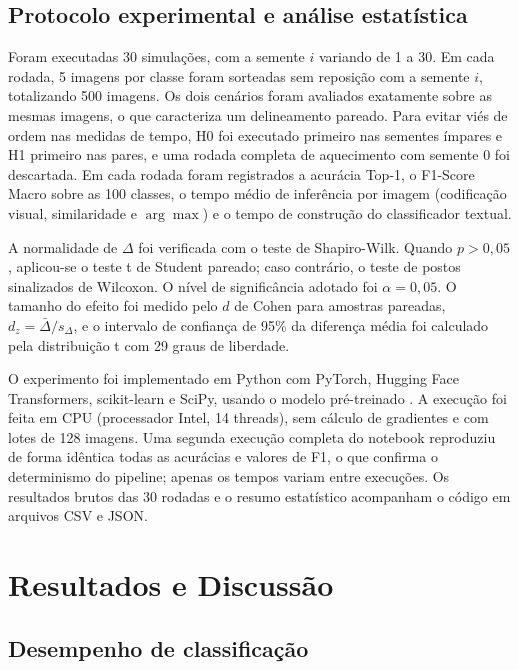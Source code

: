 \documentclass[conference]{IEEEtran}
\begin{document}
\subsection{Protocolo experimental e análise estatística}

Foram executadas 30 simulações, com a semente $i$ variando de 1 a 30. Em cada rodada, 5 imagens por classe foram sorteadas sem reposição com a semente $i$, totalizando 500 imagens. Os dois cenários foram avaliados exatamente sobre as mesmas imagens, o que caracteriza um delineamento pareado. Para evitar viés de ordem nas medidas de tempo, H0 foi executado primeiro nas sementes ímpares e H1 primeiro nas pares, e uma rodada completa de aquecimento com semente 0 foi descartada. Em cada rodada foram registrados a acurácia Top-1, o F1-Score Macro sobre as 100 classes, o tempo médio de inferência por imagem (codificação visual, similaridade e $\arg\max$) e o tempo de construção do classificador textual.

A normalidade de $\Delta$ foi verificada com o teste de Shapiro-Wilk. Quando $p > 0{,}05$, aplicou-se o teste t de Student pareado; caso contrário, o teste de postos sinalizados de Wilcoxon. O nível de significância adotado foi $\alpha = 0{,}05$. O tamanho do efeito foi medido pelo $d$ de Cohen para amostras pareadas, $d_z = \bar{\Delta} / s_\Delta$, e o intervalo de confiança de 95\% da diferença média foi calculado pela distribuição t com 29 graus de liberdade.

O experimento foi implementado em Python com PyTorch, Hugging Face Transformers, scikit-learn e SciPy, usando o modelo pré-treinado . A execução foi feita em CPU (processador Intel, 14 threads), sem cálculo de gradientes e com lotes de 128 imagens. Uma segunda execução completa do notebook reproduziu de forma idêntica todas as acurácias e valores de F1, o que confirma o determinismo do pipeline; apenas os tempos variam entre execuções. Os resultados brutos das 30 rodadas e o resumo estatístico acompanham o código em arquivos CSV e JSON.

\section{Resultados e Discussão}

\subsection{Desempenho de classificação}
\end{document}

